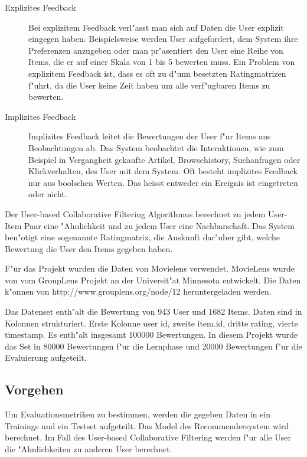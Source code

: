 \documentclass[a4paper, 12pt]{article}
\begin{document}
\begin{description}
\item[Explizites Feedback] Bei explizitem Feedback verl"asst man sich auf Daten die User explizit eingegen haben. Beispielsweise werden User aufgefordert, dem System ihre Preferenzen anzugeben oder man pr"asentiert den User eine Reihe von Items, die er auf einer Skala von 1 bis 5 bewerten muss. Ein Problem von explizitem Feedback ist, dass es oft zu d"unn besetzten Ratingmatrizen f"uhrt, da die User keine Zeit haben um alle verf"ugbaren Items zu bewerten.
\item[Implizites Feedback] Implizites Feedback leitet die Bewertungen der User f"ur Items aus Beobachtungen ab. Das System beobachtet die Interaktionen, wie zum Beispiel in Vergangheit gekaufte Artikel, Browsehistory, Suchanfragen oder Klickverhalten, des User mit dem System. Oft besteht implizites Feedback nur aus boolschen Werten. Das heisst entweder ein Ereignis ist eingetreten oder nicht.
\end{description}

 Der User-based Collaborative Filtering Algorithmus berechnet zu jedem User-Item Paar eine "Ahnlichkeit und zu jedem User eine Nachbarschaft. Das System ben"otigt eine sogenannte Ratingmatrix, die Auskunft dar"uber gibt, welche Bewertung die User den Items gegeben haben.

F"ur das Projekt wurden die Daten von Movielens verwendet. MovieLens wurde von vom GroupLens Projekt an der Universit"at Minnesota entwickelt. Die Daten k"onnen von http://www.grouplens.org/node/12 heruntergeladen werden. 

Das Datenset enth"alt die Bewertung von 943 User und 1682 Items.  Daten sind in Kolonnen strukturiert. Erste Kolonne user id, zweite item.id, dritte rating, vierte timestamp. Es enth"alt insgesamt 100000 Bewertungen. In diesem Projekt wurde das Set in 80000 Bewertungen f"ur die Lernphase und 20000 Bewertungen f"ur die Evaluierung aufgeteilt. 

\subsection{Vorgehen}
\label{sec:procedure}

Um Evaluationsmetriken zu bestimmen, werden die gegeben Daten in ein Trainings und ein Testset aufgeteilt. Das Model des Recommendersystem wird berechnet. Im Fall des User-based Collaborative Filtering werden f"ur alle User die "Ahnlichkeiten zu anderen User berechnet.
\end{document}
